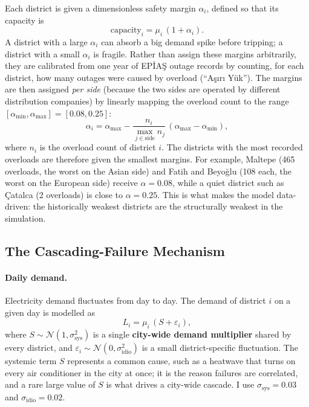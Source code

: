 \documentclass[11pt,a4paper]{article}
\begin{document}
Each district is given a dimensionless safety margin $\alpha_i$, defined so that
its capacity is
\begin{equation}
    \text{capacity}_i = \mu_i \, (1 + \alpha_i).
\end{equation}
A district with a large $\alpha_i$ can absorb a big demand spike before tripping;
a district with a small $\alpha_i$ is fragile. Rather than assign these margins
arbitrarily, they are calibrated from one year of EPİAŞ outage records by
counting, for each district, how many outages were caused by overload
(``Aşırı Yük''). The margins are then assigned \emph{per side} (because the two
sides are operated by different distribution companies) by linearly mapping the
overload count to the range $[\alpha_{\min}, \alpha_{\max}] = [0.08, 0.25]$:
\begin{equation}
    \alpha_i = \alpha_{\max} - \frac{n_i}{\max_{j \in \text{side}} n_j}\,(\alpha_{\max} - \alpha_{\min}),
\end{equation}
where $n_i$ is the overload count of district $i$. The districts with the most
recorded overloads are therefore given the smallest margins. For example,
Maltepe (465 overloads, the worst on the Asian side) and Fatih and Beyoğlu (108
each, the worst on the European side) receive $\alpha = 0.08$, while a quiet
district such as Çatalca (2 overloads) is close to $\alpha = 0.25$. This is what
makes the model data-driven: the historically weakest districts are the
structurally weakest in the simulation.

\subsection{The Cascading-Failure Mechanism}

\paragraph{Daily demand.}
Electricity demand fluctuates from day to day. The demand of district $i$ on a
given day is modelled as
\begin{equation}
    L_i = \mu_i \, (S + \varepsilon_i),
\end{equation}
where $S \sim \mathcal{N}(1, \sigma_{\text{sys}}^2)$ is a single
\textbf{city-wide demand multiplier} shared by every district, and
$\varepsilon_i \sim \mathcal{N}(0, \sigma_{\text{idio}}^2)$ is a small
district-specific fluctuation. The systemic term $S$ represents a common cause,
such as a heatwave that turns on every air conditioner in the city at once; it is
the reason failures are correlated, and a rare large value of $S$ is what drives
a city-wide cascade. I use $\sigma_{\text{sys}} = 0.03$ and
$\sigma_{\text{idio}} = 0.02$.
\end{document}
